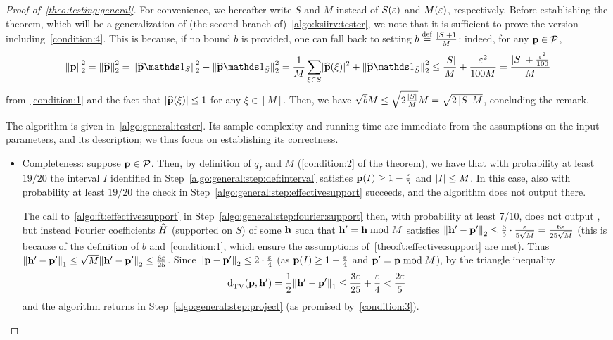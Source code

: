 \begin{proof}[Proof of~\cref{theo:testing:general}]
  For convenience, we hereafter write $S$ and $M$ instead of $S(\varepsilon)$ and $M(\varepsilon)$, respectively. Before establishing the theorem, which will be a generalization of (the second branch of)~\cref{algo:ksiirv:tester}, we note that it is sufficient to prove the version including~\cref{condition:4}. This is because, if no bound $b$ is provided, one can fall back to setting $b\stackrel{\rm def}{=}\frac{\left\lvert S \right\rvert+1}{M}$: indeed, for any $\mathbf{p}\in\mathcal{P}$,
  \begin{equation}\label{eq:default:bound:l2:norm}
      \normtwo{\p}^2 = \normtwo{\fourier{\p}}^2 = \normtwo{\fourier{\p}\indicSet{S}}^2+\normtwo{\fourier{\p}\indicSet{\bar{S}}}^2
      = \frac{1}{M}\sum_{\xi\in S}\dabs{\fourier{\p}(\xi)}^2 + \normtwo{\fourier{\p}\indicSet{\bar{S}}}^2
      \leq \frac{\abs{S}}{M} + \frac{\eps^2}{100M} = \frac{\abs{S}+\frac{\eps^2}{100}}{M}
  \end{equation}
  from~\cref{condition:1} and the fact that $\lvert \widehat{\mathbf{p}}(\xi) \rvert\leq 1$ for any $\xi\in[M]$. Then, we have $\sqrt{b}M \leq \sqrt{2\frac{\left\lvert S \right\rvert}{M}}M = \sqrt{2\left\lvert S \right\rvert M}$, concluding the remark. 
  
  The algorithm is given in~\cref{algo:general:tester}. Its sample complexity and running time are immediate from the assumptions on the input parameters, and its description; we thus focus on establishing its correctness.
  
  \begin{itemize}
      \item Completeness: suppose $\mathbf{p}\in\mathcal{P}$. Then, by definition of $q_I$ and $M$ (\cref{condition:2} of the theorem), we have that with probability at least $19/20$ the interval $I$ identified in Step~\ref{algo:general:step:def:interval} satisfies $\mathbf{p}(I)\geq 1-\frac{\varepsilon}{5}$ and $\left\lvert I \right\rvert\leq M$. In this case, also with probability at least $19/20$ the check in Step~\ref{algo:general:step:effectivesupport} succeeds, and the algorithm does not output \reject there.
      
      The call to~\cref{algo:ft:effective:support} in Step~\ref{algo:general:step:fourier:support} then, with probability at least 7/10, does not output \reject, but instead Fourier coefficients $\widehat{H}$ (supported on $S$) of some $\mathbf{h}$ such that $\mathbf{h}'=\mathbf{h} \bmod M$ satisfies ${\lVert\mathbf{h}'-\mathbf{p}'{\rVert}}_2 \leq \frac{6}{5}\cdot \frac{\varepsilon}{5\sqrt{M}} = \frac{6\varepsilon}{25\sqrt{M}}$ (this is because of the definition of $b$ and~\cref{condition:1}, which ensure the assumptions of~\cref{theo:ft:effective:support} are met). Thus ${\lVert\mathbf{h}'-\mathbf{p}'{\rVert}}_1 \leq \sqrt{M}{\lVert\mathbf{h}'-\mathbf{p}'{\rVert}}_2 \leq \frac{6\varepsilon}{25}$. Since ${\lVert\mathbf{p}-\mathbf{p}'{\rVert}}_2 \leq 2\cdot\frac{\varepsilon}{4}$ (as $\mathbf{p}(I)\geq 1-\frac{\varepsilon}{4}$ and $\mathbf{p}'=\mathbf{p}\bmod M$), by the triangle inequality
      \[
        {\operatorname{d}_{\textrm{TV}}^{}\!\left({\mathbf{p}, \mathbf{h}'}\right)} = \frac{1}{2}{\lVert\mathbf{h}'-\mathbf{p}'{\rVert}}_1 \leq \frac{3\varepsilon}{25}+\frac{\varepsilon}{4} < \frac{2\varepsilon}{5}
      \]
      and the algorithm returns \accept in Step~\ref{algo:general:step:project} (as promised by~\cref{condition:3}).
      

\end{itemize}
\end{proof}
